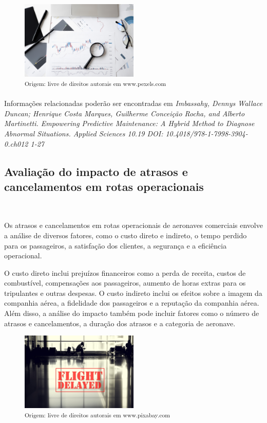 \documentclass{amsart}
\begin{document}
\begin{figure}[h]
	\centering
	\includegraphics[width=0.5\textwidth]{Images/analise_dados.jpg}\\
	\small\textsuperscript{Origem: livre de direitos autorais em www.pexels.com}
\end{figure}

Informações relacionadas poderão ser encontradas em {\it Imbassahy, Dennys Wallace Duncan; Henrique Costa Marques, Guilherme Conceição Rocha, and Alberto Martinetti. Empowering Predictive Maintenance: A Hybrid Method to Diagnose Abnormal Situations. Applied Sciences 10.19 DOI: 10.4018/978-1-7998-3904-0.ch012 1-27}

\subsection{Avaliação do impacto de atrasos e cancelamentos em rotas operacionais}\

Os atrasos e cancelamentos em rotas operacionais de aeronaves comerciais envolve a análise de diversos fatores, como o custo direto e indireto, o tempo perdido para os passageiros, a satisfação dos clientes, a segurança e a eficiência operacional.

O custo direto inclui prejuízos financeiros como a perda de receita, custos de combustível, compensações aos passageiros, aumento de horas extras para os tripulantes e outras despesas. O custo indireto inclui os efeitos sobre a imagem da companhia aérea, a fidelidade dos passageiros e a reputação da companhia aérea. Além disso, a análise do impacto também pode incluir fatores como o número de atrasos e cancelamentos, a duração dos atrasos e a categoria de aeronave.

\begin{figure}[h]
	\centering
	\includegraphics[width=0.5\textwidth]{Images/flight_delay.jpg}\\
	\small\textsuperscript{Origem: livre de direitos autorais em www.pixabay.com}
\end{figure}
\end{document}
